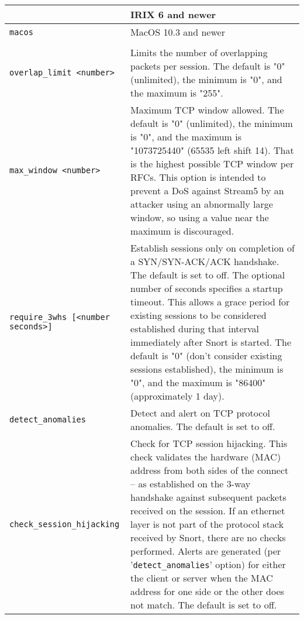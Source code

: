 \documentclass[english]{report}
\begin{document}
\begin{longtable}[h]{| p{2in} | p{4in} |}
\begin{tabular}{| l | p{2.5in} |}
\hline
\texttt{irix} & IRIX 6 and newer\\

\hline
\texttt{macos} & MacOS 10.3 and newer\\

\hline
\end{tabular}\\

\hline
\texttt{overlap\_limit <number>} &

Limits the number of overlapping packets per session.  The default is "0"
(unlimited), the minimum is "0", and the maximum is "255".\\

\hline
\texttt{max\_window <number>} &

Maximum TCP window allowed.  The default is "0" (unlimited), the minimum is
"0", and the maximum is "1073725440" (65535 left shift 14).  That is the
highest possible TCP window per RFCs.  This option is intended to prevent a DoS
against Stream5 by an attacker using an abnormally large window, so using a
value near the maximum is discouraged.\\

\hline
\texttt{require\_3whs [<number seconds>]} &

Establish sessions only on completion of a SYN/SYN-ACK/ACK handshake.  The
default is set to off.  The optional number of seconds specifies a startup
timeout.  This allows a grace period for existing sessions to be considered
established during that interval immediately after Snort is started.  The
default is "0" (don't consider existing sessions established), the minimum is
"0", and the maximum is "86400" (approximately 1 day).\\

\hline
\texttt{detect\_anomalies} &

Detect and alert on TCP protocol anomalies.  The default is set to off.\\

\hline
\texttt{check\_session\_hijacking} &

Check for TCP session hijacking.  This check validates the hardware (MAC)
address from both sides of the connect -- as established on the 3-way handshake
against subsequent packets received on the session.  If an ethernet layer is
not part of the protocol stack received by Snort, there are no checks
performed.  Alerts are generated (per '\texttt{detect\_anomalies}' option) for
either the client or server when the MAC address for one side or the other does
not match.  The default is set to off.\\


\end{longtable}
\end{document}

